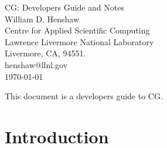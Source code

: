 \documentclass[11pt]{article}
\begin{document}


\def\comma  {~~~,~~}
\newcommand{\uvd}{\mathbf{U}}
\def\ud     {{    U}}
\def\pd     {{    P}}
\def\calo{{\cal O}}

\newcommand{\mbar}{\bar{m}}
\newcommand{\Rbar}{\bar{R}}
\newcommand{\Ru}{R_u}         %
\newcommand{\Div}{\grad\cdot}
\newcommand{\tauv}{\boldsymbol{\tau}}
\newcommand{\thetav}{\boldsymbol{\theta}}

\newcommand{\Omegav}{\boldsymbol{\Omega}}
\newcommand{\omegav}{\boldsymbol{\omega}}
\newcommand{\cm}{{\rm cm}}

\newcommand{\sumi}{\sum_{i=1}^n}
\newcommand{\dt}{{\Delta t}}

\def\ff {\tt} %

\vspace{5\baselineskip}
\begin{flushleft}
{\Large
CG: Developers Guide and Notes \\
}
\vspace{2\baselineskip}
William D. Henshaw  \\
Centre for Applied Scientific Computing  \\
Lawrence Livermore National Laboratory      \\
Livermore, CA, 94551.  \\
henshaw@llnl.gov \\
\vspace{\baselineskip}
\today\\
\vspace{\baselineskip}

\vspace{4\baselineskip}


  This document is a developers guide to CG.

\end{flushleft}

\clearpage
\tableofcontents

\vfill\eject

\section{Introduction}


\clearpage


\clearpage


\clearpage

\end{document}
